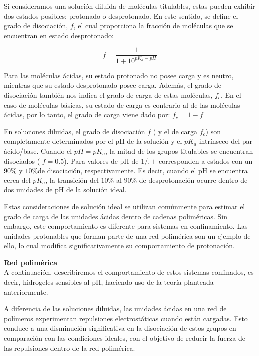 Si consideramos una soluci\'on diluida de mol\'eculas titulables, estas pueden exhibir dos estados posibles: protonado o desprotonado. En este sentido, se define el grado de disociaci\'on, $f$, el cual proporciona la fracci\'on de mol\'eculas que se encuentran en estado desprotonado:

\begin{equation}
	f = \frac{1}{1+10^{pK_a -pH}}
	\label{eq:film:diso-ideal}
\end{equation}

Para las mol\'eculas \'acidas, su estado protonado no posee carga y es neutro, mientras que su estado desprotonado posee carga. Adem\'as, el grado de disociaci\'on tambi\'en nos indica el grado de carga de estas mol\'eculas, $f_c$. 
En el caso de mol\'eculas b\'asicas, su estado de carga es contrario al de las mol\'eculas \'acidas, por lo tanto, el grado de carga viene dado por: $f_c = 1 -f$


En soluciones diluidas, el grado de disociaci\'on $f$ ( y el de carga $f_c$) son completamente determinados por el pH de la soluci\'on y el $pK_a$ intr\'inseco del par \'acido/base. Cuando el $pH = pK_a$, la mitad de los grupos titulables se encuentran disociados ( $f = 0.5$).  Para valores de pH de $1/,\pm$ corresponden a estados con un $90\%$ y $10\%$de disociaci\'on, respectivamente. Es decir, cuando el pH se encuentra cerca del $pK_a$, la transici\'on del $10\%$ al $90\%$ de desprotonaci\'on ocurre dentro de dos unidades de pH de la soluci\'on ideal.

Estas consideraciones de soluci\'on ideal se utilizan com\'unmente para estimar el grado de carga de las unidades \'acidas dentro de cadenas polim\'ericas. Sin embargo, este comportamiento es diferente para sistemas en confinamiento. Las unidades protonables que forman parte de una red polim\'erica son un ejemplo de ello, lo cual modifica significativamente su comportamiento de protonaci\'on.


\textbf{Red polim\'erica} \\

A continuaci\'on, describiremos el comportamiento de estos sistemas confinados, es decir, hidrogeles sensibles al pH, haciendo uso de la teor\'ia planteada anteriormente.

A diferencia de las soluciones diluidas, las unidades \'acidas en una red de pol\'imeros experimentan repulsiones electrost\'aticas cuando est\'an cargadas. Esto conduce a una disminuci\'on significativa en la disociaci\'on de estos grupos en comparaci\'on con las condiciones ideales, con el objetivo de reducir la fuerza de las repulsiones dentro de la red polim\'erica.

